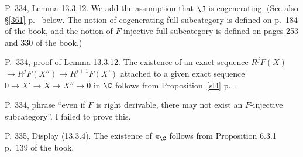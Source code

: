 \documentclass[12pt]{article}
\theoremstyle{remark}
\theoremstyle{definition}
\begin{document}
%

\begin{s}
P. 334, Lemma 13.3.12. We add the assumption that $\J$ is cogenerating. (See also \S\ref{361} p.~ below. The notion of cogenerating full subcategory is defined on p.~184 of the book, and the notion of $F$-injective full subcategory is defined on pages 253 and 330 of the book.)
\end{s}

%

\begin{s}
P.~334, proof of Lemma 13.3.12. The existence of an exact sequence $R^jF(X)$ $\to R^jF(X'')\to R^{j+1}F(X')$ attached to a given exact sequence $0\to X'\to X\to X''\to0$ in $\C$ follows from Proposition~\ref{sl4} p.~.
\end{s}

%

\begin{uspb}
P. 334, phrase ``even if $F$ is right derivable, there may not exist an $F$-injective subcategory''. I failed to prove this.
\end{uspb}

%

\begin{s}
P. 335, Display (13.3.4). The existence of $\pi_\C$ follows from Proposition 6.3.1 p.~139 of the book.
\end{s}

%
\end{document}
